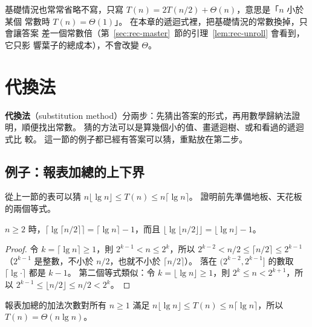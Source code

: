 基礎情況也常常省略不寫，只寫 $T(n) = 2T(n/2) + \Theta(n)$，意思是「$n$ 小於某個
常數時 $T(n) = \Theta(1)$」。 在本章的遞迴式裡，把基礎情況的常數換掉，只會讓答案
差一個常數倍（第~\ref{sec:rec-master}~節的引理~\ref{lem:rec-unroll} 會看到，它只影
響葉子的總成本），不會改變 $\Theta$。

\section{代換法}
\label{sec:rec-subst}

\textbf{代換法}（substitution method）分兩步：先猜出答案的形式，再用數學歸納法證
明，順便找出常數。 猜的方法可以是算幾個小的值、畫遞迴樹、或和看過的遞迴式比
較。 這一節的例子都已經有答案可以猜，重點放在第二步。

\subsection{例子：報表加總的上下界}

從上一節的表可以猜 $n \lfloor \lg n \rfloor \le T(n) \le n \lceil \lg n \rceil$。
證明前先準備地板、天花板的兩個等式。

\begin{lemma}
\label{lem:rec-lg-half}
$n \ge 2$ 時，$\lceil \lg \lceil n/2 \rceil \rceil = \lceil \lg n \rceil - 1$，而且
$\lfloor \lg \lfloor n/2 \rfloor \rfloor = \lfloor \lg n \rfloor - 1$。
\end{lemma}

\begin{proof}
令 $k = \lceil \lg n \rceil \ge 1$，則 $2^{k-1} < n \le 2^k$，所以
$2^{k-2} < n/2 \le \lceil n/2 \rceil \le 2^{k-1}$（$2^{k-1}$ 是整數，不小於
$n/2$，也就不小於 $\lceil n/2 \rceil$）。 落在 $(2^{k-2}, 2^{k-1}]$ 的數取
$\lceil \lg \cdot \rceil$ 都是 $k - 1$。 第二個等式類似：令
$k = \lfloor \lg n \rfloor \ge 1$，則 $2^k \le n < 2^{k+1}$，所以
$2^{k-1} \le \lfloor n/2 \rfloor \le n/2 < 2^k$。
\end{proof}

\begin{theorem}
\label{thm:rec-audit}
報表加總的加法次數對所有 $n \ge 1$ 滿足
$n \lfloor \lg n \rfloor \le T(n) \le n \lceil \lg n \rceil$，所以
$T(n) = \Theta(n \lg n)$。
\end{theorem}

